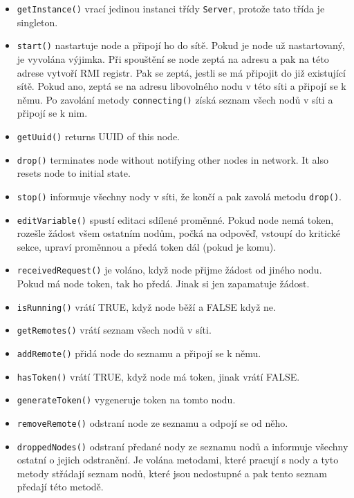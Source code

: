 \documentclass[11pt]{scrartcl}
\begin{document}
    \begin{itemize}
        \item \texttt{getInstance()} vrací jedinou instanci třídy \texttt{Server}, protože tato třída je singleton.
        \item \texttt{start()} nastartuje node a připojí ho do sítě. Pokud je node už nastartovaný, je vyvolána
        výjimka. Při spouštění se node zeptá na adresu a pak na této adrese vytvoří RMI registr. Pak se zeptá, jestli
        se má připojit do již existující sítě. Pokud ano, zeptá se na adresu libovolného nodu v této síti a připojí
        se k němu. Po zavolání metody \texttt{connecting()} získá seznam všech nodů v síti a připojí se k nim.
        \item \texttt{getUuid()} returns UUID of this node.
        \item \texttt{drop()} terminates node without notifying other nodes in network. It also resets node to 
        initial state.
        \item \texttt{stop()} informuje všechny nody v síti, že končí a pak zavolá metodu \texttt{drop()}.
        \item \texttt{editVariable()} spustí editaci sdílené proměnné. Pokud node nemá token, rozešle žádost všem 
        ostatním nodům, počká na odpověď, vstoupí do kritické sekce, upraví proměnnou a předá token dál (pokud je komu).
        \item \texttt{receivedRequest()} je voláno, když node přijme žádost od jiného nodu. Pokud má node token, tak 
        ho předá. Jinak si jen zapamatuje žádost.
        \item \texttt{isRunning()} vrátí TRUE, když node běží a FALSE když ne.
        \item \texttt{getRemotes()} vrátí seznam všech nodů v síti.
        \item \texttt{addRemote()} přidá node do seznamu a připojí se k němu.
        \item \texttt{hasToken()} vrátí TRUE, když node má token, jinak vrátí FALSE.
        \item \texttt{generateToken()} vygeneruje token na tomto nodu.
        \item \texttt{removeRemote()} odstraní node ze seznamu a odpojí se od něho.
        \item \texttt{droppedNodes()} odstraní předané nody ze seznamu nodů a informuje všechny ostatní o jejich
        odstranění. Je volána metodami, které pracují s nody a tyto metody střádají seznam nodů, které jsou
        nedostupné a pak tento seznam předají této metodě.
    \end{itemize}
\end{document}
